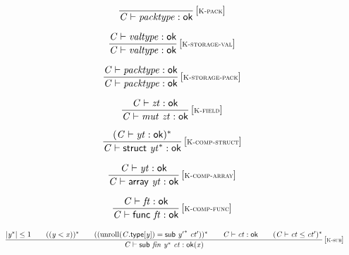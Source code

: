 $$
\begin{array}{@{}c@{}}\displaystyle
\frac{
}{
{\mathit{C}} \vdash {\mathit{packtype}} : \mathsf{ok}
} \, {[\textsc{\scriptsize K{-}pack}]}
\qquad
\end{array}
$$

$$
\begin{array}{@{}c@{}}\displaystyle
\frac{
{\mathit{C}} \vdash {\mathit{valtype}} : \mathsf{ok}
}{
{\mathit{C}} \vdash {\mathit{valtype}} : \mathsf{ok}
} \, {[\textsc{\scriptsize K{-}storage{-}val}]}
\qquad
\end{array}
$$

$$
\begin{array}{@{}c@{}}\displaystyle
\frac{
{\mathit{C}} \vdash {\mathit{packtype}} : \mathsf{ok}
}{
{\mathit{C}} \vdash {\mathit{packtype}} : \mathsf{ok}
} \, {[\textsc{\scriptsize K{-}storage{-}pack}]}
\qquad
\end{array}
$$

$$
\begin{array}{@{}c@{}}\displaystyle
\frac{
{\mathit{C}} \vdash {\mathit{zt}} : \mathsf{ok}
}{
{\mathit{C}} \vdash {\mathit{mut}}~{\mathit{zt}} : \mathsf{ok}
} \, {[\textsc{\scriptsize K{-}field}]}
\qquad
\end{array}
$$

\vspace{1ex}

$$
\begin{array}{@{}c@{}}\displaystyle
\frac{
({\mathit{C}} \vdash {\mathit{yt}} : \mathsf{ok})^\ast
}{
{\mathit{C}} \vdash \mathsf{struct}~{{\mathit{yt}}^\ast} : \mathsf{ok}
} \, {[\textsc{\scriptsize K{-}comp{-}struct}]}
\qquad
\end{array}
$$

$$
\begin{array}{@{}c@{}}\displaystyle
\frac{
{\mathit{C}} \vdash {\mathit{yt}} : \mathsf{ok}
}{
{\mathit{C}} \vdash \mathsf{array}~{\mathit{yt}} : \mathsf{ok}
} \, {[\textsc{\scriptsize K{-}comp{-}array}]}
\qquad
\end{array}
$$

$$
\begin{array}{@{}c@{}}\displaystyle
\frac{
{\mathit{C}} \vdash {\mathit{ft}} : \mathsf{ok}
}{
{\mathit{C}} \vdash \mathsf{func}~{\mathit{ft}} : \mathsf{ok}
} \, {[\textsc{\scriptsize K{-}comp{-}func}]}
\qquad
\end{array}
$$

\vspace{1ex}

$$
\begin{array}{@{}c@{}}\displaystyle
\frac{
{|{{\mathit{y}}^\ast}|} \leq 1
 \qquad
(({\mathit{y}} < {\mathit{x}}))^\ast
 \qquad
(({\mathrm{unroll}}({\mathit{C}}.\mathsf{type}{}[{\mathit{y}}]) = \mathsf{sub}~{{\mathit{y}'}^\ast}~{\mathit{ct}'}))^\ast
 \qquad
{\mathit{C}} \vdash {\mathit{ct}} : \mathsf{ok}
 \qquad
({\mathit{C}} \vdash {\mathit{ct}} \leq {\mathit{ct}'})^\ast
}{
{\mathit{C}} \vdash \mathsf{sub}~{\mathit{fin}}~{{\mathit{y}}^\ast}~{\mathit{ct}} : {\mathsf{ok}}{({\mathit{x}})}
} \, {[\textsc{\scriptsize K{-}sub}]}
\qquad
\end{array}
$$

